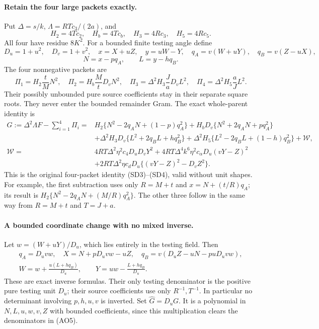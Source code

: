 \paragraph{Retain the four large packets exactly.}
Put $\Delta=s/k$, $\Lambda=RTc_3/(2a)$, and
\[
 H_2=4Tc_2,\quad H_b=4Tc_b,\quad H_3=4Rc_3,\quad H_5=4Rc_5.
\]
All four have residue $8K^2$. For a bounded finite testing angle define
\[
 D_u=1+u^2,\quad D_v=1+v^2,\quad
 x=X+uZ,\quad y=uW-Y,\quad
 q_A=v(W+uY),\quad q_B=v(Z-uX),
\]
\[
                    N=x-pq_A,\qquad L=y-hq_B.
\]
The four nonnegative packets are
\[
 \Pi_1=H_2\frac tM N^2,\quad
 \Pi_2=H_b\frac MtD_vN^2,\quad
 \Pi_3=\Delta^2H_3\frac JaD_vL^2,\quad
 \Pi_4=\Delta^2H_5\frac aJL^2.                         \tag{AO3}
\]
Their possibly unbounded pure source coefficients stay in their
separate square roots. They never enter the bounded remainder Gram.
The exact whole-parent identity is
\begin{align*}
 G:=\Delta^2\Lambda F-\sum_{i=1}^4\Pi_i
 ={}&H_2\{N^2-2q_AN+(1-p)q_A^2\}
     +H_bD_v\{N^2+2q_AN+pq_A^2\}\\
 &+\Delta^2H_3D_v\{L^2+2q_BL+hq_B^2\}
     +\Delta^2H_5\{L^2-2q_BL+(1-h)q_B^2\}
     +\mathcal W,                                      \tag{AO4}\\
 \mathcal W={}&4RT\Delta^2\eta^2c_4D_uD_vY^2
   +4RT\Delta^4k^6\eta^2c_\alpha D_u(vY-Z)^2\\
 &+2RT\Delta^2\eta c_dD_u\{(vY-Z)^2-D_vZ^2\}.
\end{align*}
This is the original four-packet identity (SD3)--(SD4), valid without
unit shapes. For example, the first subtraction uses only
$R=M+t$ and $x=N+(t/R)q_A$; its result is
$H_2\{N^2-2q_AN+(M/R)q_A^2\}$. The other three follow in the
same way from $R=M+t$ and $T=J+a$.

\paragraph{A bounded coordinate change with no mixed inverse.}
Let $w=(W+uY)/D_u$, which lies entirely in the testing field. Then
\[
\begin{gathered}
 q_A=D_uv w,\quad
 X=N+pD_uv w-uZ,\quad
 q_B=v(D_uZ-uN-puD_uv w),\\
 W=w+\frac{u(L+hq_B)}{D_u},\qquad
 Y=uw-\frac{L+hq_B}{D_u}.                             
\end{gathered}
\tag{AO5}
\]
These are exact inverse formulas. Their only testing denominator is
the positive pure testing unit $D_u$; their source coefficients use
only $R^{-1},T^{-1}$. In particular no determinant involving $p,h,u,v$
is inverted. Set $\widehat G=D_uG$. It is a polynomial in
$N,L,u,w,v,Z$ with bounded coefficients, since this multiplication
clears the denominators in (AO5).


